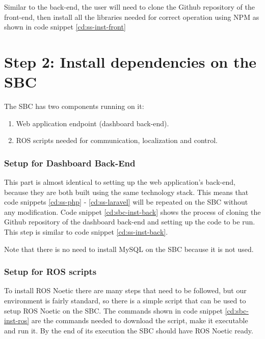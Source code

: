 Similar to the back-end, the user will need to clone the Github repository of the front-end, then install all the libraries needed for correct operation using NPM as shown in code snippet \ref{cd:ss-inst-front}

\newpage

\section{Step 2: Install dependencies on the SBC}
The SBC has two components running on it:
\begin{enumerate}
	\item Web application endpoint (dashboard back-end).
	\item ROS scripts needed for communication, localization and control.
\end{enumerate}

\subsubsection{Setup for Dashboard Back-End}
This part is almost identical to setting up the web application's back-end, because they are both built using the same technology stack. This means that code snippets \ref{cd:ss-php} - \ref{cd:ss-laravel} will be repeated on the SBC without any modification. Code snippet \ref{cd:sbc-inst-back} shows the process of cloning the Github repository of the dashboard back-end and setting up the code to be run. This step is similar to code snippet \ref{cd:ss-inst-back}.


Note that there is no need to install MySQL on the SBC because it is not used.

\subsubsection{Setup for ROS scripts}
To install ROS Noetic there are many steps that need to be followed, but our environment is fairly standard, so there is a simple script that can be used to setup ROS Noetic on the SBC. The commands shown in code snippet \ref{cd:sbc-inst-ros} are the commands needed to download the script, make it executable and run it. By the end of its execution the SBC should have ROS Noetic ready. 


